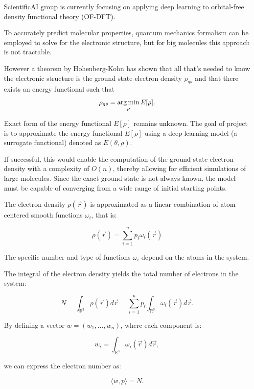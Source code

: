 \documentclass[a4paper,10.5pt]{report}
\begin{document}

 ScientificAI group is currently focusing on applying deep learning to orbital-free density functional theory (OF-DFT).

 To accurately predict molecular properties, quantum mechanics formalism can be employed to solve for the electronic structure, but for big molecules this approach is not tractable.

However a theorem by Hohenberg-Kohn has shown that all that's needed to know the electronic structure is the ground state electron density $\rho_{gs}$ and that there exists an energy functional such that
\begin{equation*}
 \rho_{gs} = \operatorname*{arg\,min}_\rho E[\rho].
\end{equation*}


Exact form of the energy functional $E[\rho]$ remains unknown. The goal of  project is to approximate the energy functional $E[\rho]$ using a deep learning model (a surrogate functional) denoted as $E(\theta, \rho)$.

If successful, this would enable the computation of the ground-state electron density with a complexity of $O(n)$, thereby allowing for efficient simulations of large molecules. Since the exact ground state is not always known, the model must be capable of converging from a wide range of initial starting points.

The electron density $\rho(\vec{r})$ is approximated as a linear combination of atom-centered smooth functions $\omega_i$, that is:

\[
\rho(\vec{r}) = \sum_{i=1}^n p_i \omega_i(\vec{r})
\]

The specific number and type of functions $\omega_i$ depend on the atoms in the system.

The integral of the electron density yields the total number of electrons in the system:

\[
N = \int_{\mathbb{R}^3} \rho(\vec{r}) d\vec{r} = \sum_{i=1}^n p_i \int_{\mathbb{R}^3} \omega_i(\vec{r}) d\vec{r}.
\]

By defining a vector $w = (w_1, \ldots, w_n)$, where each component is:

\[
w_i = \int_{\mathbb{R}^3} \omega_i(\vec{r}) d\vec{r},
\]

we can express the electron number as:

\[
\langle w, p \rangle = N.
\]
\end{document}

